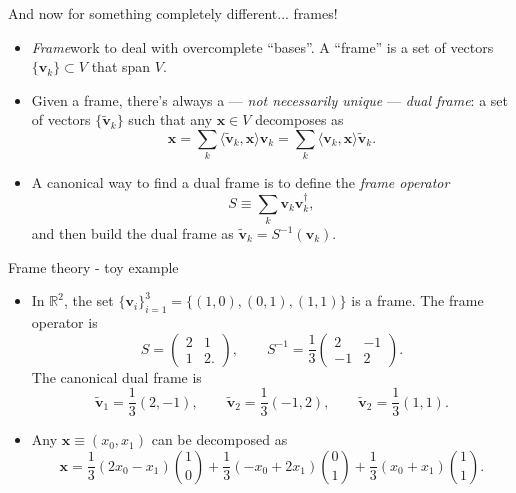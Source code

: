 \documentclass{beamer}
\begin{document}
\begin{frame}{And now for something completely different... frames!}
    \begin{itemize}\setlength\itemsep{0.5em}
        \item \textit{Frame}work to deal with overcomplete ``bases''. A ``frame'' is a set of vectors $\{\mathbf v_k\}\subset V$ that span $V$.
        \item Given a frame, there's always a --- \textit{not necessarily unique} --- \textit{dual frame}: a set of vectors $\{\tilde{\mathbf v}_k\}$ such that any $\mathbf x\in V$ decomposes as
        \begin{equation*}
            \mathbf x = \sum_k \langle \tilde{\mathbf v}_k, \mathbf x\rangle \mathbf v_k
            = \sum_k \langle \mathbf v_k, \mathbf x\rangle \tilde{\mathbf v}_k.
        \end{equation*}
        \item A canonical way to find a dual frame is to define the \textit{frame operator}
        \begin{equation*}
            S \equiv \sum_k \mathbf v_k \mathbf v_k^\dagger,
        \end{equation*}
        and then build the dual frame as $\tilde{\mathbf v}_k = S^{-1}(\mathbf v_k)$.
    \end{itemize}
\end{frame}

\begin{frame}{Frame theory - toy example}
    \begin{itemize}
        \item In $\mathbb{R}^2$, the set $\{\mathbf v_i\}_{i=1}^3=\{(1,0), (0,1), (1,1)\}$ is a frame. The frame operator is
        \begin{equation*}
            S = \begin{pmatrix}
                2 & 1 \\ 1 & 2.
            \end{pmatrix},
            \qquad
            S^{-1} = \frac13\begin{pmatrix}
                 2 & -1 \\ -1 & 2
            \end{pmatrix}.
        \end{equation*}
        The canonical dual frame is
        \begin{equation*}
            \tilde{\mathbf v}_1 = \frac13(2,-1),
            \qquad
            \tilde{\mathbf v}_2 = \frac13(-1,2),
            \qquad
            \tilde{\mathbf v}_2 = \frac13(1,1).
        \end{equation*}
        \item Any $\mathbf x\equiv (x_0,x_1)$ can be decomposed as
        \begin{equation*}
            \mathbf x = \frac13(2x_0-x_1) \binom{1}{0}
            +
            \frac13(-x_0+2x_1) \binom{0}{1} +
            \frac13(x_0+x_1) \binom{1}{1}.
        \end{equation*}
    \end{itemize}
\end{frame}
\end{document}
